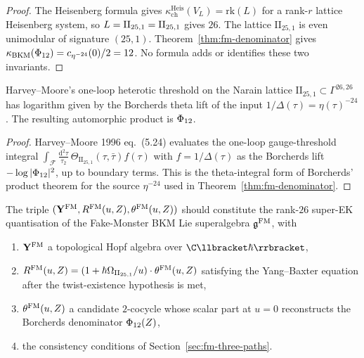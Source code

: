 \begin{proof}
The Heisenberg formula gives
$\kappa_{\mathrm{ch}}^{\mathrm{Heis}}(V_L)=\mathrm{rk}(L)$ for a rank-$r$
lattice Heisenberg system, so $L=\mathrm{II}_{25,1}=\mathrm{II}_{25,1}$ gives $26$.
The lattice $\mathrm{II}_{25,1}$ is even unimodular of signature
$(25,1)$. Theorem~\ref{thm:fm-denominator} gives
$\kappa_{\mathrm{BKM}}(\Phi_{12})=c_{\eta^{-24}}(0)/2=12$. No formula adds
or identifies these two invariants.
\end{proof}

\begin{proposition}
\label{prop:fm-vol-ii-consistency}
Harvey--Moore's one-loop heterotic threshold on the Narain lattice
$\mathrm{II}_{25,1}\subset\Gamma^{26,26}$ has logarithm given by the
Borcherds theta lift of the input $1/\Delta(\tau)=\eta(\tau)^{-24}$.
The resulting automorphic product is $\Phi_{12}$.
\end{proposition}

\begin{proof}
Harvey--Moore 1996 eq.~(5.24) evaluates the one-loop gauge-threshold integral $\int_{\mathcal{F}} \frac{\mathrm{d}^2\tau}{\tau_2}\,\Theta_{\mathrm{II}_{25,1}}(\tau,\bar\tau) f(\tau)$ with $f = 1/\Delta(\tau)$ as the Borcherds lift $-\log|\Phi_{12}|^2$, up to boundary terms. This is the theta-integral form of Borcherds' product theorem for the source $\eta^{-24}$ used in Theorem~\ref{thm:fm-denominator}.
\end{proof}

\begin{conjecture}
\label{thm:fm-rtt-master}
\ClaimStatusConjectured
{}
The triple $(\mathbf{Y}^{\mathrm{FM}}, R^{\mathrm{FM}}(u,Z), \theta^{\mathrm{FM}}(u,Z))$ should constitute the rank-$26$ super-EK quantisation of the Fake-Monster BKM Lie superalgebra $\mathfrak{g}^{\mathrm{FM}}$, with
\begin{enumerate}[label=\textup{(\arabic*)}]
\item $\mathbf{Y}^{\mathrm{FM}}$ a topological Hopf algebra over $\C\llbracket\hbar\rrbracket$,
\item $R^{\mathrm{FM}}(u,Z) = (1 + \hbar\Omega_{\mathrm{II}_{25,1}}/u)\cdot \theta^{\mathrm{FM}}(u,Z)$ satisfying the Yang--Baxter equation after the twist-existence hypothesis is met,
\item $\theta^{\mathrm{FM}}(u, Z)$ a candidate $2$-cocycle whose scalar part at $u=0$ reconstructs the Borcherds denominator $\Phi_{12}(Z)$,
\item the consistency conditions of Section~\ref{sec:fm-three-paths}.
\end{enumerate}
\end{conjecture}

